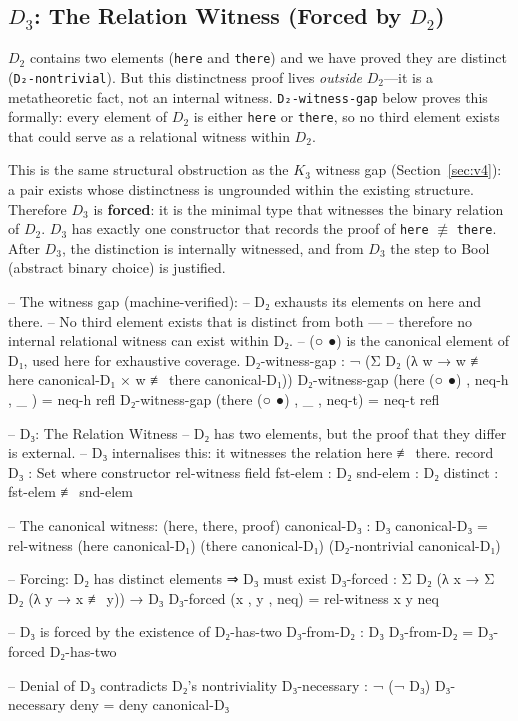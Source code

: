 \documentclass[11pt,a4paper]{article}
\begin{document}
\subsection{$D_3$: The Relation Witness (Forced by $D_2$)}

$D_2$ contains two elements (\texttt{here} and \texttt{there}) and we have
proved they are distinct (\texttt{D₂-nontrivial}). But this distinctness
proof lives \emph{outside} $D_2$---it is a metatheoretic fact, not an
internal witness. \texttt{D₂-witness-gap} below proves this formally: every
element of $D_2$ is either \texttt{here} or \texttt{there}, so no third
element exists that could serve as a relational witness within $D_2$.

This is the same structural obstruction as the $K_3$ witness gap
(Section~\ref{sec:v4}): a pair exists whose distinctness is ungrounded
within the existing structure. Therefore $D_3$ is \textbf{forced}: it is the
minimal type that witnesses the binary relation of $D_2$. $D_3$ has exactly
one constructor that records the proof of \texttt{here} $\not\equiv$
\texttt{there}. After $D_3$, the distinction is internally witnessed, and
from $D_3$ the step to Bool (abstract binary choice) is justified.

\begin{code}
-- The witness gap (machine-verified):
-- D₂ exhausts its elements on here and there.
-- No third element exists that is distinct from both —
-- therefore no internal relational witness can exist within D₂.
-- (○ ●) is the canonical element of D₁, used here for exhaustive coverage.
D₂-witness-gap : ¬ (Σ D₂ (λ w → w ≢ here canonical-D₁ × w ≢ there canonical-D₁))
D₂-witness-gap (here  (○ ●) , neq-h , _    ) = neq-h refl
D₂-witness-gap (there (○ ●) , _     , neq-t) = neq-t refl

-- D₃: The Relation Witness
-- D₂ has two elements, but the proof that they differ is external.
-- D₃ internalises this: it witnesses the relation here ≢ there.
record D₃ : Set where
  constructor rel-witness
  field
    fst-elem : D₂
    snd-elem : D₂
    distinct  : fst-elem ≢ snd-elem

-- The canonical witness: (here, there, proof)
canonical-D₃ : D₃
canonical-D₃ = rel-witness (here canonical-D₁) (there canonical-D₁) (D₂-nontrivial canonical-D₁)

-- Forcing: D₂ has distinct elements ⇒ D₃ must exist
D₃-forced : Σ D₂ (λ x → Σ D₂ (λ y → x ≢ y)) → D₃
D₃-forced (x , y , neq) = rel-witness x y neq

-- D₃ is forced by the existence of D₂-has-two
D₃-from-D₂ : D₃
D₃-from-D₂ = D₃-forced D₂-has-two

-- Denial of D₃ contradicts D₂'s nontriviality
D₃-necessary : ¬ (¬ D₃)
D₃-necessary deny = deny canonical-D₃
\end{code}
\end{document}

